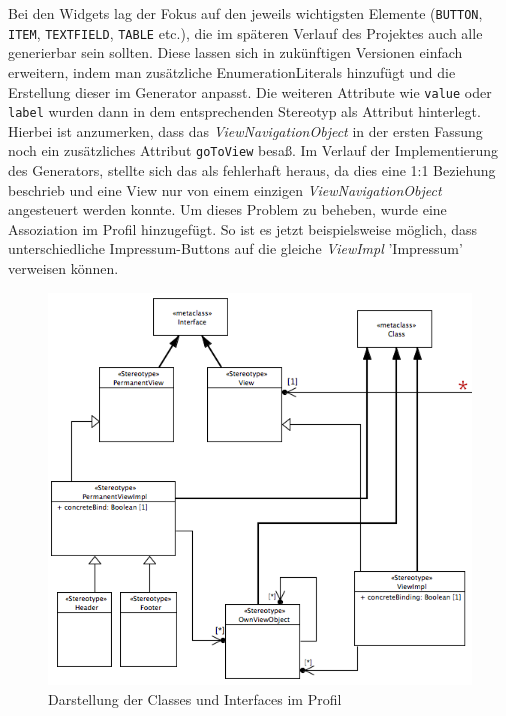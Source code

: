 Bei den Widgets lag der Fokus auf den jeweils wichtigsten Elemente (\texttt{BUTTON}, \texttt{ITEM}, \texttt{TEXTFIELD}, \texttt{TABLE} etc.), die im späteren Verlauf des Projektes auch alle generierbar sein sollten. Diese lassen sich in zukünftigen Versionen einfach erweitern, indem man zusätzliche EnumerationLiterals hinzufügt und die Erstellung dieser im Generator anpasst. Die weiteren Attribute wie \texttt{value} oder \texttt{label} wurden dann in dem entsprechenden Stereotyp als Attribut hinterlegt.
Hierbei ist anzumerken, dass das \textit{ViewNavigationObject} in der ersten Fassung noch ein zusätzliches Attribut \texttt{goToView} besaß. Im Verlauf der Implementierung des Generators, stellte sich das als fehlerhaft heraus, da dies eine 1:1 Beziehung beschrieb und eine View nur von einem einzigen \textit{ViewNavigationObject} angesteuert werden konnte. Um dieses Problem zu beheben, wurde eine Assoziation im Profil hinzugefügt. So ist es jetzt beispielsweise möglich, dass unterschiedliche Impressum-Buttons auf die gleiche \textit{ViewImpl} 'Impressum' verweisen können. \\
\begin{figure}[ht]
\begin{center}
\includegraphics[width=\textwidth]{./img/ProfilClass.png}
\caption{Darstellung der Classes und Interfaces im Profil}\label{Fig:UMLProfilClass}
\end{center}
\end{figure}

